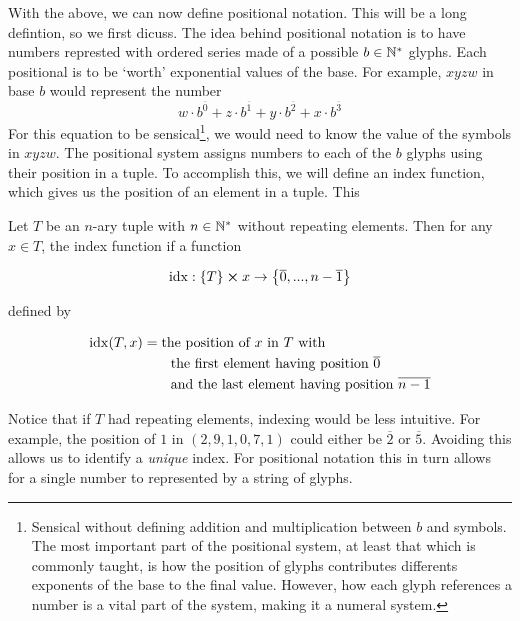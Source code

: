 \documentclass{article}
\begin{document}
	With the above, we can now define positional notation. This will be a long defintion, so we first dicuss. The idea behind positional notation is to have numbers represted with ordered series made of a possible $b\in\mathbb{N}^*$ glyphs. Each positional is to be `worth' exponential values of the base. For example, $xyzw$ in base $b$ would represent the number
	\begin{equation}\label{eq7}
		w\cdot b^{\overline{0}} + z\cdot b^{\overline{1}} + y\cdot b^{\overline{2}} + x\cdot b^{\overline{3}}
	\end{equation}
	For this equation to be sensical\footnote{Sensical without defining addition and multiplication between $b$ and symbols. The most important part of the positional system, at least that which is commonly taught, is how the position of glyphs contributes differents exponents of the base to the final value. However, how each glyph references a number is a vital part of the system, making it a numeral system.}, we would need to know the value of the symbols in $xyzw$. The positional system assigns numbers to each of the $b$ glyphs using their position in a tuple. To accomplish this, we will define an index function,  which gives us the position of an element in a tuple. This
	
	Let $T$ be an $n$-ary tuple with $n\in\mathbb{N}^*$ without repeating elements. Then for any $x\in T$, the index function if a function
	
	\begin{equation}\label{eq8}
		\idx: \Bqty{T}\cross x\to \Bqty{\overline{0}, ..., n-\overline{1}}
	\end{equation}
	
	defined by
	
	\begin{align}\label{eq9}
		\operatorname{idx} (T, x) &= \text{the position of $x$ in $T$ with} \\
					&\qquad\text{the first element having position $\overline{0}$}\nonumber \\
					&\qquad\text{and the last element having position $\overline{n-1}$}\nonumber
	\end{align}
	
	Notice that if $T$ had repeating elements, indexing would be less intuitive. For example, the position of $1$ in $(2, 9, 1, 0, 7, 1)$ could either be $\overline{2}$ or $\overline{5}$. Avoiding this allows us to identify a \textit{unique} index. For positional notation this in turn allows for a single number to represented by a string of glyphs.
	
\end{document}

